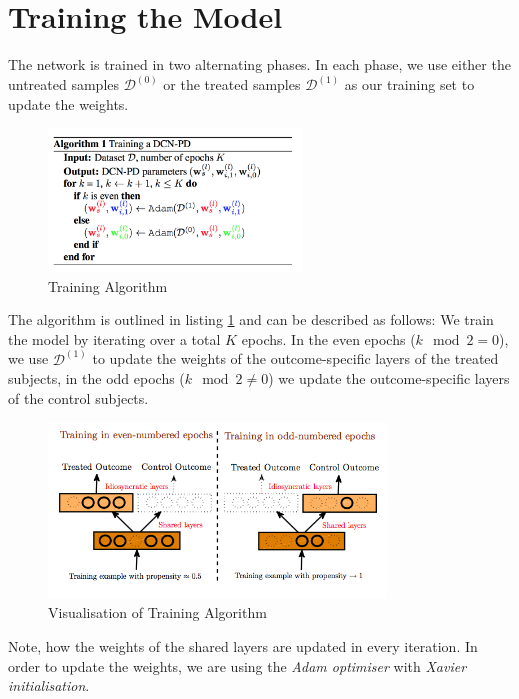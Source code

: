 \section{Training the Model} \label{sec:dcn-training}
The network is trained in two alternating phases. In each phase, we use either the untreated samples $\mathcal{D}^{(0)}$ or the treated samples $\mathcal{D}^{(1)}$ as our training set to update the weights. 
\begin{figure}[h]
	\centering
	\includegraphics[width=0.6\textwidth]{figures/chapter-3/training-algorithm.png}
	\caption{Training Algorithm}\label{fig:training-algorithm}
\end{figure}
The algorithm is outlined in listing \ref{fig:training-algorithm} and can be described as follows: We train the model by iterating over a total $K$ epochs. In the even epochs ($k \mod 2 = 0$), we use $\mathcal{D}^{(1)}$ to update the weights of the outcome-specific layers of the treated subjects, in the odd epochs ($k \mod 2 \neq 0$) we update the outcome-specific layers of the control subjects. 

\begin{figure}[h]
	\centering
	\includegraphics[width=0.8\textwidth]{figures/chapter-3/pbd-training.png}
	\caption{Visualisation of Training Algorithm}\label{fig:dcn-training}
\end{figure}


Note, how the weights of the shared layers are updated in every iteration. In order to update the weights, we are using the \emph{Adam optimiser} with \emph{Xavier initialisation}. %


